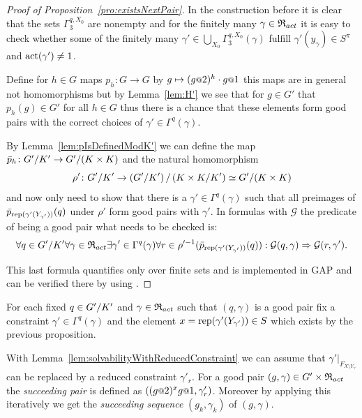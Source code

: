 \documentclass[a4paper,11pt]{amsart}
\begin{document}
\begin{proof}[Proof of Proposition~\ref{pro:existsNextPair}]
 In the construction before it is clear that the sets $\Gamma_3^{q,X_0}$ 
 are nonempty and for the finitely many $\gamma\in \mathfrak{R}_{act}$ it is
 easy to check whether some of the finitely many 
 $\gamma'\in\bigcup_{X_0}\Gamma_3^{q,X_0}(\gamma)$ fulfill 
 $\gamma'(y_\gamma) \in S^\pi$ and $\operatorname{act}(\gamma')\neq 1$.
 
 
  Define for $h\in G$ maps $p_h\colon G\to G$ by $g\mapsto (g\at{2})^{h}\cdot g\at{1}$ 
  this maps are in general not homomorphisms but 
  by Lemma~\ref{lem:H'} 
  we see that for $g\in G'$ that $p_h(g)\in G'$ for all $h\in G$ thus there is a chance 
  that these elements form good pairs with the correct choices of $\gamma' \in \Gamma^q(\gamma)$. 
 
  By Lemma~\ref{lem:pIsDefinedModK'} we can define the map $\bar p_h\colon {G'/K'} \to {G'/(K\times K)}$
 and the natural homomorphism \[\rho'\colon {G'/K'} \to {\left({G'/K'}\right)/\left({K\times K/K'}\right)} \simeq {G'/(K\times K)} \]
 and now only need to show that there is a $\gamma'\in\Gamma^q(\gamma)$ such that all preimages of $\bar p_{\textup{rep}(\gamma'(Y_{\gamma'}))}(q)$ under $\rho'$ 
 form good pairs with $\gamma'$. In formulas with $\mathcal{G}$ the predicate of being a good pair what needs to be checked is: 
 \[\forall q\in{G'/K'}
      \forall \gamma\in\mathfrak{R}_{act} 
	 \exists \gamma'\in \Gamma^q(\gamma)
	    \forall r\in \rho'^{-1}(\bar p_{\textup{rep}(\gamma'(Y_{\gamma'}))}(q)):
	      \mathcal{G}(q,\gamma) \Rightarrow \mathcal{G}(r,\gamma').\]
 
 This last formula quantifies only over finite sets and is implemented in GAP 
 and can be verified there by using . 
 \end{proof}

 \begin{defi}
 For each fixed $q\in{G'/K'}$ and $\gamma\in \mathfrak{R}_{act}$ such that $(q,\gamma)$ is a good pair
 fix a constraint $\gamma'\in\Gamma^q(\gamma)$ and the element 
 $x=\textup{rep}(\gamma'(Y_{\gamma'}))\in S$ which exists by the previous proposition.
 
 With Lemma~\ref{lem:solvabilityWithReducedConstraint} we can assume that $\gamma'|_{F_{X\setminus Y_{\gamma'}}}$ can be replaced by a reduced constraint $\gamma'_r$. 
 For a good pair $(g,\gamma)\in G'\times\mathfrak{R}_{act}$ the \emph{succeeding pair} is defined as $\left((g\at{2})^xg\at{1},\gamma'_r\right)$.
 Moreover by applying this iteratively we get the \emph{succeeding sequence} $(g_k,\gamma_k)$ of $(g,\gamma)$.
 \end{defi}
 
\end{document}
